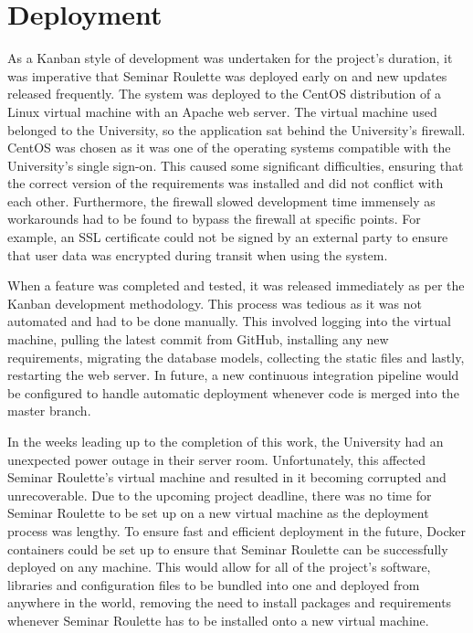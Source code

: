 \documentclass{l4proj}
\begin{document}
\section{Deployment}
\label{section:deployment}

As a Kanban style of development was undertaken for the project's duration, it was imperative that Seminar Roulette was deployed early on and new updates released frequently. The system was deployed to the CentOS distribution of a Linux virtual machine with an Apache web server. The virtual machine used belonged to the University, so the application sat behind the University's firewall. CentOS was chosen as it was one of the operating systems compatible with the University's single sign-on. This caused some significant difficulties, ensuring that the correct version of the requirements was installed and did not conflict with each other. Furthermore, the firewall slowed development time immensely as workarounds had to be found to bypass the firewall at specific points. For example, an SSL certificate could not be signed by an external party to ensure that user data was encrypted during transit when using the system.

When a feature was completed and tested, it was released immediately as per the Kanban development methodology. This process was tedious as it was not automated and had to be done manually. This involved logging into the virtual machine, pulling the latest commit from GitHub, installing any new requirements, migrating the database models, collecting the static files and lastly, restarting the web server. In future, a new continuous integration pipeline would be configured to handle automatic deployment whenever code is merged into the master branch.

In the weeks leading up to the completion of this work, the University had an unexpected power outage in their server room. Unfortunately, this affected Seminar Roulette's virtual machine and resulted in it becoming corrupted and unrecoverable. Due to the upcoming project deadline, there was no time for Seminar Roulette to be set up on a new virtual machine as the deployment process was lengthy. To ensure fast and efficient deployment in the future, Docker \citep{docker} containers could be set up to ensure that Seminar Roulette can be successfully deployed on any machine. This would allow for all of the project's software, libraries and configuration files to be bundled into one and deployed from anywhere in the world, removing the need to install packages and requirements whenever Seminar Roulette has to be installed onto a new virtual machine.
\end{document}
